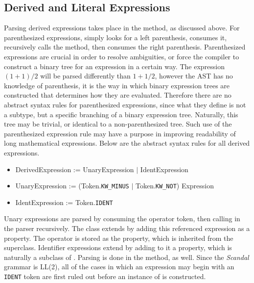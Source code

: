 \subsection{Derived and Literal Expressions}

Parsing derived expressions takes place in the  method, as discussed above. For parenthesized expressions,  simply looks for a left parenthesis, consumes it, recursively calls the  method, then consumes the right parenthesis. Parenthesized expressions are crucial in order to resolve ambiguities, or force the compiler to construct a binary tree for an expression in a certain way. The expression $(1 + 1) / 2$ will be parsed differently than $1 + 1 / 2$, however the AST has no knowledge of parenthesis, it is the way in which binary expression trees are constructed that determines how they are evaluated. Therefore there are no abstract syntax rules for parenthesized expressions, since what they define is not a subtype, but a specific branching of a binary expression tree. Naturally, this tree may be trivial, or identical to a non-parenthesized tree. Such use of the parenthesized expression rule may have a purpose in improving readability of long mathematical expressions. Below are the abstract syntax rules for all derived expressions.

\begin{itemize}
	\item DerivedExpression := UnaryExpression $|$ IdentExpression
	\item UnaryExpression := (Token.\texttt{KW\_MINUS} $|$ Token.\texttt{KW\_NOT}) Expression
	\item IdentExpression := Token.\texttt{IDENT}
\end{itemize}

Unary expressions are parsed by consuming the operator token, then calling  in the parser recursively. The  class extends  by adding this referenced expression as a property. The operator is stored as the  property, which is inherited from the superclass. Identifier expressions extend  by adding to it a  property, which is naturally a subclass of . Parsing is done in the  method, as well. Since the \emph{Scandal} grammar is LL(2), all of the cases in which an expression may begin with an \texttt{IDENT} token are first ruled out before an instance of  is constructed.


